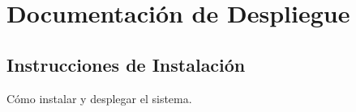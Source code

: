	\chapter{Documentación de Despliegue}
	
	\section{Instrucciones de Instalación}
	Cómo instalar y desplegar el sistema.
	
